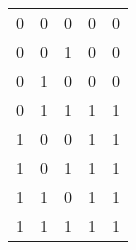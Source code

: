 \documentclass{report}
\begin{document}
\begin{enumerate}
\begin{center}
\begin{tabular}{| c | c | c | c | c |}
    0 & 0 & 0 & 0 & 0 \\

    0 & 0 & 1 & 0 & 0 \\

    0 & 1 & 0 & 0 & 0 \\

    0 & 1 & 1 & 1 & 1 \\

    1 & 0 & 0 & 1 & 1 \\

    1 & 0 & 1 & 1 & 1 \\

    1 & 1 & 0 & 1 & 1 \\

    1 & 1 & 1 & 1 & 1 \\ \hline

  \end{tabular}

\end{center}

\end{enumerate}

\end{document}
